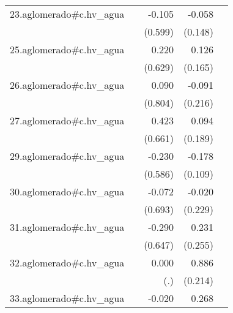 {\begin{longtable}{l*{4}{D{.}{.}{-1}}}
\addlinespace
23.aglomerado#c.hv\_agua&                     &      -0.105         &      -0.058         &                     \\
            &                     &     (0.599)         &     (0.148)         &                     \\
\addlinespace
25.aglomerado#c.hv\_agua&                     &       0.220         &       0.126         &                     \\
            &                     &     (0.629)         &     (0.165)         &                     \\
\addlinespace
26.aglomerado#c.hv\_agua&                     &       0.090         &      -0.091         &                     \\
            &                     &     (0.804)         &     (0.216)         &                     \\
\addlinespace
27.aglomerado#c.hv\_agua&                     &       0.423         &       0.094         &                     \\
            &                     &     (0.661)         &     (0.189)         &                     \\
\addlinespace
29.aglomerado#c.hv\_agua&                     &      -0.230         &      -0.178         &                     \\
            &                     &     (0.586)         &     (0.109)         &                     \\
\addlinespace
30.aglomerado#c.hv\_agua&                     &      -0.072         &      -0.020         &                     \\
            &                     &     (0.693)         &     (0.229)         &                     \\
\addlinespace
31.aglomerado#c.hv\_agua&                     &      -0.290         &       0.231         &                     \\
            &                     &     (0.647)         &     (0.255)         &                     \\
\addlinespace
32.aglomerado#c.hv\_agua&                     &       0.000         &       0.886\sym{***}&                     \\
            &                     &         (.)         &     (0.214)         &                     \\
\addlinespace
33.aglomerado#c.hv\_agua&                     &      -0.020         &       0.268\sym{***}&                     \\

\end{longtable}}
